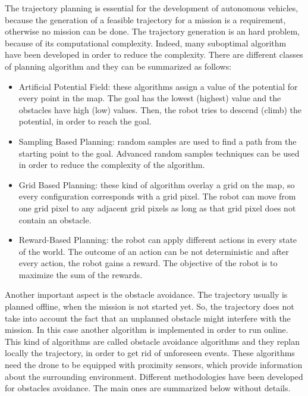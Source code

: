 The trajectory planning is essential for the development of autonomous vehicles,
because the generation of a feasible trajectory for a mission is a requirement,
otherwise no mission can be done.
The trajectory generation is an hard problem, because of its computational complexity.
Indeed, many suboptimal algorithm have been developed in order to reduce the
complexity.
There are different classes of planning algorithm and they can be summarized as follows:
\begin{itemize}
  \item Artificial Potential Field: these algorithms assign a value of the potential
  for every point in the map. The goal has the lowest (highest) value and the obstacles
  have high (low) values. Then, the robot tries to descend (climb) the potential,
  in order to reach the goal.

  \item Sampling Based Planning: random samples are used to find a path from the
  starting point to the goal. Advanced random samples techniques can be used in order
  to reduce the complexity of the algorithm.

  \item Grid Based Planning: these kind of algorithm overlay a grid on the map, so
  every configuration corresponds with a grid pixel.
  The robot can move from one grid pixel to any adjacent grid pixels as long
  as that grid pixel does not contain an obstacle.

  \item Reward-Based Planning: the robot can apply different actions in every state
  of the world. The outcome of an action can be not deterministic and after every
  action, the robot gains a reward. The objective of the robot is to maximize the
  sum of the rewards.
\end{itemize}

Another important aspect is the obstacle avoidance. The trajectory usually is planned
offline, when the mission is not started yet. So, the trajectory does not take into
account the fact that an unplanned obstacle might interfere with the mission. In this
case another algorithm is implemented in order to run online. This kind of algorithms
are called obstacle avoidance algorithms and they replan locally the trajectory, in
order to get rid of unforeseen events. These algorithms need the drone to be equipped
with proximity sensors, which provide information about the surrounding environment.
Different methodologies have been developed for obstacles avoidance. The main ones are
summarized below without details.

